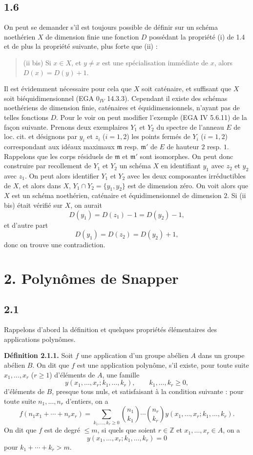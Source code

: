 \documentclass[11pt]{article}
\begin{document}
\subsection*{1.6}
On peut se demander s'il est toujours possible de définir sur un schéma noethérien $X$ de dimension finie une fonction $D$ possédant la propriété (i) de 1.4 et de plus la propriété suivante, plus forte que (ii) :
\begin{quote}
(ii bis) Si $x\in X$, et $y\ne x$ est une spécialisation immédiate de $x$, alors $D(x)=D(y)+1$.
\end{quote}
Il est évidemment nécessaire pour cela que $X$ soit caténaire, et suffisant que $X$ soit biéquidimensionnel (EGA $0_{IV}$ 14.3.3). Cependant il existe des schémas noethériens de dimension finie, caténaires et équidimensionnels, n'ayant pas de telles fonctions $D$. Pour le voir on peut modifier l'exemple (EGA IV 5.6.11) de la façon suivante. Prenons deux exemplaires $Y_1$ et $Y_2$ du spectre de l'anneau $E$ de loc. cit. et désignons par $y_i$ et $z_i$ ($i=1,2$) les points fermés de $Y_i$ ($i=1,2$) correspondant aux idéaux maximaux $\mathfrak m$ resp. $\mathfrak m'$ de $E$ de hauteur $2$ resp. $1$. Rappelons que les corps résiduels de $\mathfrak m$ et $\mathfrak m'$ sont isomorphes. On peut donc construire par recollement de $Y_1$ et $Y_2$ un schéma $X$ en identifiant $y_1$ avec $z_2$ et $y_2$ avec $z_1$. On peut alors identifier $Y_1$ et $Y_2$ avec les deux composantes irréductibles de $X$, et alors dans $X$, $Y_1\cap Y_2=\{y_1,y_2\}$ est de dimension zéro. On voit alors que $X$ est un schéma noethérien, caténaire et équidimensionnel de dimension $2$. Si (ii bis) était vérifié sur $X$, on aurait
\[
D(y_1)=D(z_1)-1=D(y_2)-1,
\]
et d'autre part
\[
D(y_1)=D(z_2)=D(y_2)+1,
\]
donc on trouve une contradiction.

\section*{2. Polynômes de Snapper}

\subsection*{2.1}
Rappelons d'abord la définition et quelques propriétés élémentaires des applications polynômes.

\textbf{Définition 2.1.1.} Soit $f$ une application d'un groupe abélien $A$ dans un groupe abélien $B$. On dit que $f$ est une application polynôme, s'il existe, pour toute suite $x_1,\ldots,x_r$ ($r\geq1$) d'éléments de $A$, une famille
\[
y(x_1,\ldots,x_r;k_1,\ldots,k_r),\qquad k_1,\ldots,k_r\geq0,
\]
d'éléments de $B$, presque tous nuls, et satisfaisant à la condition suivante : pour toute suite $n_1,\ldots,n_r$ d'entiers, on a
\[
f(n_1x_1+\cdots+n_rx_r)=
\sum_{k_1,\ldots,k_r\geq0}\binom{n_1}{k_1}\cdots\binom{n_r}{k_r}
y(x_1,\ldots,x_r;k_1,\ldots,k_r).
\]
On dit que $f$ est de degré $\leq m$, si quels que soient $r\in\mathbb Z$ et $x_1,\ldots,x_r\in A$, on a
\[
y(x_1,\ldots,x_r;k_1,\ldots,k_r)=0
\]
pour $k_1+\cdots+k_r>m$.
\end{document}
